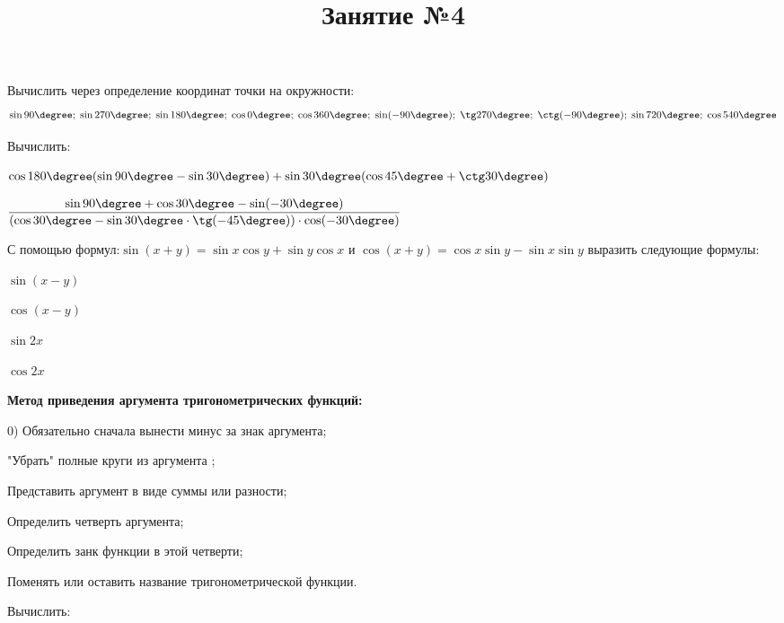 \newpage
\title{Занятие №4}
\begin{listofex}
	\item Вычислить через определение координат точки на окружности:
	\[ \sin90\degree;\;\sin270\degree;\;\sin180\degree;\;\cos0\degree;\;\cos360\degree;\;\sin(-90\degree);\;\tg270\degree;\;\ctg(-90\degree);\;\sin720\degree;\;\cos540\degree \]
	\item Вычислить:
	\begin{enumcols}[itemcolumns=1]
		\item \( \cos180\degree(\sin90\degree-\sin30\degree)+\sin30\degree(\cos45\degree+\ctg30\degree) \) 
		\item \( \dfrac{\sin90\degree+\cos30\degree-\sin(-30\degree)}{(\cos30\degree-\sin30\degree\cdot\tg(-45\degree))\cdot\cos(-30\degree)} \) 
	\end{enumcols}
	\item С помощью формул:\quad\( \sin(x+y)=\sin x\cos y + \sin y \cos x \) и \( \cos(x+y)=\cos x \sin y - \sin x \sin y \) выразить следующие формулы:
	\begin{enumcols}[itemcolumns=4]
		\item \( \sin(x-y) \)
		\item \( \cos(x-y) \)
		\item \( \sin2x \)
		\item \( \cos2x \)
	\end{enumcols}
	\item \textbf{Метод приведения аргумента тригонометрических функций:}
	\begin{enumcols}[itemcolumns=1]
		\item[0)] Обязательно сначала вынести минус за знак аргумента;
		\item "Убрать" полные круги из аргумента ;
		\item Представить аргумент в виде суммы или разности;
		\item Определить четверть аргумента;
		\item Определить занк функции в этой четверти;
		\item Поменять или оставить название тригонометрической функции.
	\end{enumcols}
	\item {}
	\item {}
	\item {}
	\item Вычислить:
	\begin{enumcols}[itemcolumns=2]
		\item {}
		\item {}
		\item {}
		\item {}
		\item {}
	\end{enumcols}
\end{listofex}

